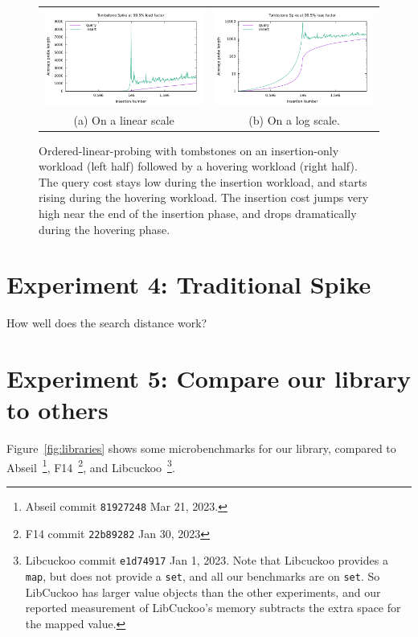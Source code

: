 \documentclass[10pt]{article}
\theoremstyle{remark}
\theoremstyle{remark}
\newcommand{\figref}[1]{Figure~\ref{fig:#1}}
\newcommand{\figlabel}[1]{\label{fig:#1}}
\begin{document}
\begin{figure}
\begin{center}
\begin{tabular}{cc}
  \includegraphics[width=75mm]{experiments/spike-1000000-0.995000} &
  \includegraphics[width=75mm]{experiments/spike-1000000-0.995000-log} \\
  (a) On a linear scale & (b) On a log scale.
\end{tabular}
\end{center}
\caption{Ordered-linear-probing with tombstones on an insertion-only
  workload (left half) followed by a hovering workload (right half).
  The query cost stays low during the insertion workload, and starts
  rising during the hovering workload.  The insertion cost jumps very
  high near the end of the insertion phase, and drops dramatically
  during the hovering phase.}
\figlabel{olpspike}
\end{figure}

\section{Experiment 4: Traditional Spike}

How well does the search distance work?

\section{Experiment 5: Compare our library to others}

\figref{libraries} shows some microbenchmarks for our library,
compared to Abseil~\cite{Abseil17}\footnote{Abseil commit
\texttt{81927248} Mar 21, 2023.}, F14~\cite{BronsonSh19}\footnote{F14
commit \texttt{22b89282} Jan 30, 2023}, and Libcuckoo~\cite{LiAnKa14,
  GoyalFaLi23}\footnote{Libcuckoo commit \texttt{e1d74917} Jan 1,
2023.  Note that Libcuckoo provides a \texttt{map}, but does not
provide a \texttt{set}, and all our benchmarks are on \texttt{set}.
So LibCuckoo has larger value objects than the other experiments, and
our reported measurement of LibCuckoo's memory subtracts the extra space
for the mapped value.}.
\end{document}
